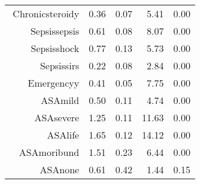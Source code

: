 \begin{tabular}{rrrrr}
$$  Chronic\-steroid\-y & 0.36 & 0.07 & 5.41 & 0.00 \\ 
  Sepsis\-sepsis & 0.61 & 0.08 & 8.07 & 0.00 \\ 
  Sepsis\-shock & 0.77 & 0.13 & 5.73 & 0.00 \\ 
  Sepsis\-sirs & 0.22 & 0.08 & 2.84 & 0.00 \\ 
  Emergency\-y & 0.41 & 0.05 & 7.75 & 0.00 \\ 
  ASA\-mild & 0.50 & 0.11 & 4.74 & 0.00 \\ 
  ASA\-severe & 1.25 & 0.11 & 11.63 & 0.00 \\ 
  ASA\-life & 1.65 & 0.12 & 14.12 & 0.00 \\ 
  ASA\-moribund & 1.51 & 0.23 & 6.44 & 0.00 \\ 
  ASA\-none & 0.61 & 0.42 & 1.44 & 0.15 \\ 
   \hline
\end{tabular}

